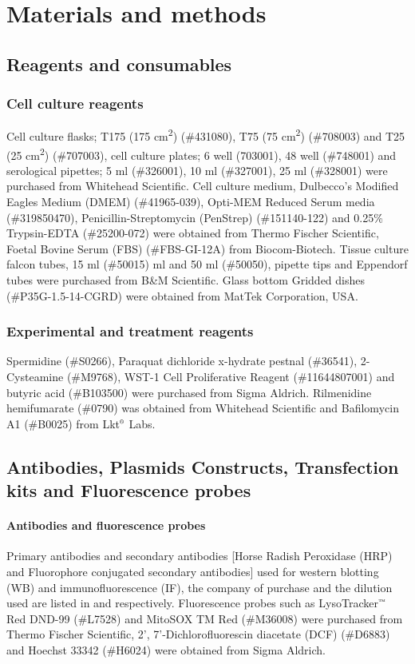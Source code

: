 \chapter{Materials and methods}
\section{Reagents and consumables}
\subsection{Cell culture reagents}
Cell culture flasks; T175 (175 cm\textsuperscript{2}) (\#431080), T75 (75 cm\textsuperscript{2}) (\#708003) and T25 (25 cm\textsuperscript{2}) (\#707003), cell culture plates; 6 well (703001), 48 well (\#748001) and serological pipettes; 5 ml (\#326001), 10 ml (\#327001), 25 ml (\#328001) were purchased from Whitehead Scientific. Cell culture medium, Dulbecco’s Modified Eagles Medium (DMEM) (\#41965-039), Opti-MEM Reduced Serum media (\#319850470), Penicillin-Streptomycin (PenStrep) (\#151140-122) and 0.25\% Trypsin-EDTA (\#25200-072) were obtained from Thermo Fischer Scientific, Foetal Bovine Serum (FBS) (\#FBS-GI-12A) from Biocom-Biotech. Tissue culture falcon tubes, 15 ml (\#50015) ml and 50 ml (\#50050), pipette tips and Eppendorf tubes were purchased from B\&M Scientific. Glass bottom Gridded dishes (\#P35G-1.5-14-CGRD) were obtained from MatTek Corporation, USA.

\subsection{Experimental and treatment reagents}
Spermidine (\#S0266), Paraquat dichloride x-hydrate pestnal (\#36541), 2-Cysteamine (\#M9768), WST-1 Cell Proliferative Reagent (\#11644807001) and butyric acid (\#B103500) were purchased from Sigma Aldrich. Rilmenidine hemifumarate (\#0790) was obtained from Whitehead Scientific and Bafilomycin A1 (\#B0025) from Lkt${\textsuperscript{\tiny{\textregistered}}}$ Labs. 

\section{Antibodies, Plasmids Constructs, Transfection kits and Fluorescence probes}
\subsubsection{Antibodies and fluorescence probes}
Primary antibodies and secondary antibodies [Horse Radish Peroxidase (HRP) and Fluorophore conjugated secondary antibodies] used for western blotting (WB) and immunofluorescence (IF), the company of purchase and the dilution used are listed in  and  respectively. Fluorescence probes such as LysoTracker${\textsuperscript{\tiny{\texttrademark}}}$ Red DND-99 (\#L7528) and MitoSOX TM Red (\#M36008) were purchased from Thermo Fischer Scientific, 2', 7'-Dichlorofluorescin diacetate (DCF) (\#D6883) and Hoechst 33342 (\#H6024) were obtained from Sigma Aldrich.

